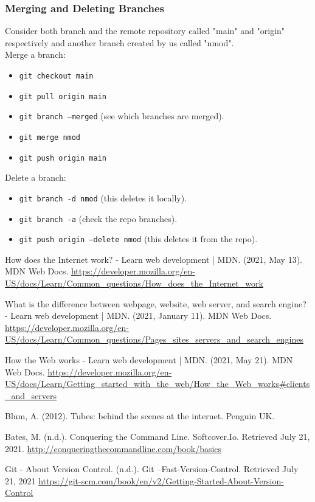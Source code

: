 \documentclass{article}
\begin{document}
    \subsubsection{Merging and Deleting Branches}
    
    Consider both branch and the remote repository called "main" and "origin" respectively and another branch created by us called "nmod".\vspace{0.5cm}\\
    
    Merge a branch:
    \begin{itemize}
    	\item {\tt git checkout main}
    	\item {\tt git pull origin main}
    	\item {\tt git branch --merged} (see which branches are merged).
    	\item {\tt git merge nmod}
    	\item {\tt git push origin main}
    \end{itemize}

    Delete a branch:
    \begin{itemize}
	    \item {\tt git branch -d nmod} (this deletes it locally).
	    \item {\tt git branch -a} (check the repo branches).
	    \item {\tt git push origin --delete nmod} (this deletes it from the repo).
    \end{itemize}
    
	\pagebreak
	
	\begin{thebibliography}{9}
		How does the Internet work? - Learn web development | MDN. (2021, May 13). MDN Web Docs.
		\url{https://developer.mozilla.org/en-US/docs/Learn/Common_questions/How_does_the_Internet_work}
		
		What is the difference between webpage, website, web server, and search engine? - Learn web development | MDN. (2021, January 11). MDN Web Docs. \url{https://developer.mozilla.org/en-US/docs/Learn/Common_questions/Pages_sites_servers_and_search_engines}
		
		How the Web works - Learn web development | MDN. (2021, May 21). MDN Web Docs.
		\url{https://developer.mozilla.org/en-US/docs/Learn/Getting_started_with_the_web/How_the_Web_works#clients_and_servers}
		
		Blum, A. (2012). Tubes: behind the scenes at the internet. Penguin UK.
		
		Bates, M. (n.d.). Conquering the Command Line. Softcover.Io. Retrieved July 21, 2021.
		\url{http://conqueringthecommandline.com/book/basics}
		
		Git - About Version Control. (n.d.). Git --Fast-Version-Control. Retrieved July 21, 2021
		\url{https://git-scm.com/book/en/v2/Getting-Started-About-Version-Control}
		\end{thebibliography}
		
	
\end{document}

